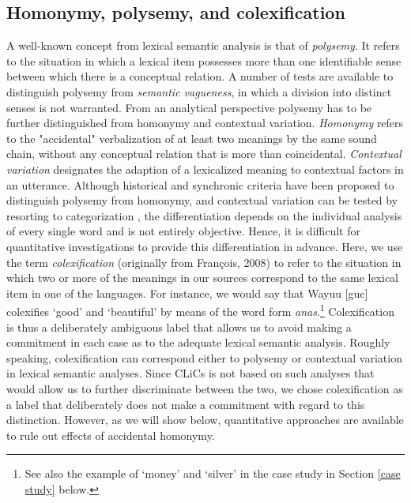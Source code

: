 \subsection{Homonymy, polysemy, and colexification}
A well-known concept from lexical semantic analysis is that of \emph{polysemy}. It refers to the situation
in which a lexical item possesses more than one identifiable sense between which there is a
conceptual relation. A number of tests are available to distinguish polysemy from \emph{semantic
vagueness}, in which a division into distinct senses is not warranted. From an analytical perspective
polysemy has to be further distinguished from {homonymy} and contextual variation.
\emph{Homonymy} refers to
the "accidental" verbalization of at least two meanings by the same sound chain, without any
conceptual relation that is more than coincidental. \emph{Contextual variation}
designates the adaption of a lexicalized meaning to contextual factors in an utterance. Although
historical and synchronic criteria have been proposed to distinguish polysemy from homonymy, and
contextual variation can be tested by resorting to categorization \cite{blank1997}, the
differentiation depends on the individual analysis of every single word and is not entirely
objective. Hence, it is difficult for quantitative investigations to provide this differentiation
in advance.
Here, we use the term \textit{colexification} (originally from Fran\c{c}ois, 2008\nocite{francois2008}) %
to refer to the situation
in which two or more of the meanings in our sources correspond to the same lexical item in one of
the languages. For instance, we would say that Wayuu [guc] colexifies `good' and `beautiful' by means of the word form \textit{anas\textbari}.\footnote{See also the example of `money' and `silver' in the case study in Section \ref{case study} below.}
Colexification is thus a deliberately ambiguous label that allows us to avoid making a commitment in
each case as to the adequate lexical semantic analysis.
Roughly speaking,
colexification can correspond either to polysemy or contextual variation in lexical semantic analyses.
Since CLiCs is not based on such analyses that would allow us to further discriminate between the
two, we chose colexification as a label that deliberately does not make a commitment with regard to
this distinction. However, as we will show below, quantitative approaches are available to rule out effects of accidental homonymy. 

